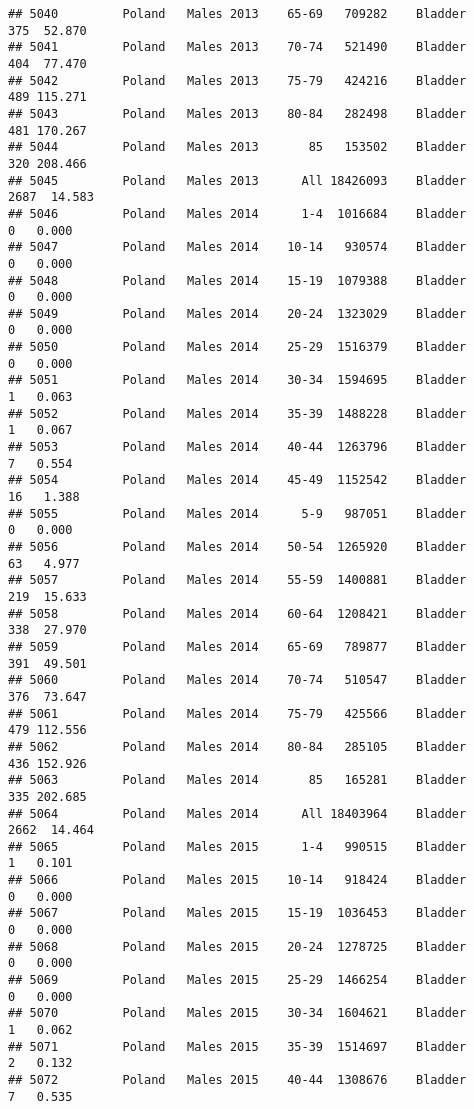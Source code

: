 \documentclass[
]{article}
\begin{document}
\begin{verbatim}
## 5040         Poland   Males 2013    65-69   709282    Bladder    375  52.870
## 5041         Poland   Males 2013    70-74   521490    Bladder    404  77.470
## 5042         Poland   Males 2013    75-79   424216    Bladder    489 115.271
## 5043         Poland   Males 2013    80-84   282498    Bladder    481 170.267
## 5044         Poland   Males 2013       85   153502    Bladder    320 208.466
## 5045         Poland   Males 2013      All 18426093    Bladder   2687  14.583
## 5046         Poland   Males 2014      1-4  1016684    Bladder      0   0.000
## 5047         Poland   Males 2014    10-14   930574    Bladder      0   0.000
## 5048         Poland   Males 2014    15-19  1079388    Bladder      0   0.000
## 5049         Poland   Males 2014    20-24  1323029    Bladder      0   0.000
## 5050         Poland   Males 2014    25-29  1516379    Bladder      0   0.000
## 5051         Poland   Males 2014    30-34  1594695    Bladder      1   0.063
## 5052         Poland   Males 2014    35-39  1488228    Bladder      1   0.067
## 5053         Poland   Males 2014    40-44  1263796    Bladder      7   0.554
## 5054         Poland   Males 2014    45-49  1152542    Bladder     16   1.388
## 5055         Poland   Males 2014      5-9   987051    Bladder      0   0.000
## 5056         Poland   Males 2014    50-54  1265920    Bladder     63   4.977
## 5057         Poland   Males 2014    55-59  1400881    Bladder    219  15.633
## 5058         Poland   Males 2014    60-64  1208421    Bladder    338  27.970
## 5059         Poland   Males 2014    65-69   789877    Bladder    391  49.501
## 5060         Poland   Males 2014    70-74   510547    Bladder    376  73.647
## 5061         Poland   Males 2014    75-79   425566    Bladder    479 112.556
## 5062         Poland   Males 2014    80-84   285105    Bladder    436 152.926
## 5063         Poland   Males 2014       85   165281    Bladder    335 202.685
## 5064         Poland   Males 2014      All 18403964    Bladder   2662  14.464
## 5065         Poland   Males 2015      1-4   990515    Bladder      1   0.101
## 5066         Poland   Males 2015    10-14   918424    Bladder      0   0.000
## 5067         Poland   Males 2015    15-19  1036453    Bladder      0   0.000
## 5068         Poland   Males 2015    20-24  1278725    Bladder      0   0.000
## 5069         Poland   Males 2015    25-29  1466254    Bladder      0   0.000
## 5070         Poland   Males 2015    30-34  1604621    Bladder      1   0.062
## 5071         Poland   Males 2015    35-39  1514697    Bladder      2   0.132
## 5072         Poland   Males 2015    40-44  1308676    Bladder      7   0.535

\end{verbatim}
\end{document}
